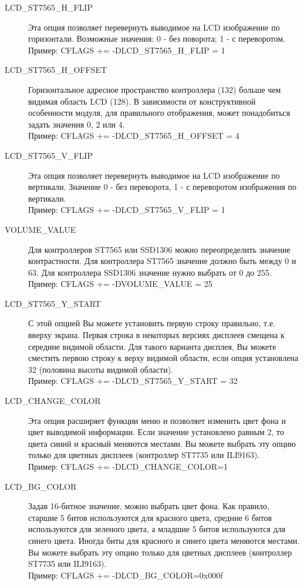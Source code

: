 \begin{description}
  \item[LCD\_ST7565\_H\_FLIP] Эта опция позволяет перевернуть выводимое на LCD изображение по горизонтали.
Возможные значения: 0 - без поворота; 1 - с переворотом.\\
Пример: CFLAGS += -DLCD\_ST7565\_H\_FLIP = 1
   
  \item[LCD\_ST7565\_H\_OFFSET] Горизонтальное адресное пространство контроллера (132) больше чем видимая область LCD (128).
В зависимости от конструктивной особенности модуля, для правильного отображения, может понадобиться задать значения 
0, 2 или 4.\\
Пример: CFLAGS += -DLCD\_ST7565\_H\_OFFSET = 4

  \item[LCD\_ST7565\_V\_FLIP] Эта опция позволяет перевернуть выводимое на LCD изображение по вертикали.
Значение 0 - без переворота, 1 - с переворотом изображения по вертикали.\\
Пример: CFLAGS += -DLCD\_ST7565\_V\_FLIP = 1

  \item[VOLUME\_VALUE] Для контроллеров ST7565 или SSD1306 можно переопределить значение контрастности.
Для контроллера ST7565 значение должно быть между 0 и 63. Для контроллера SSD1306 значение нужно
выбрать от 0 до 255.\\
Пример: CFLAGS += -DVOLUME\_VALUE = 25

  \item[LCD\_ST7565\_Y\_START] С этой опцией Вы можете установить первую строку правильно, 
т.е. вверху экрана. Первая строка в некоторых версиях дисплеев смещена к середине видимой области. 
Для такого варианта дисплея, Вы можете сместить первою строку к верху видимой области, 
если опция установлена 32 (половина высоты видимой области).\\  
Пример: CFLAGS += -DLCD\_ST7565\_Y\_START = 32

  \item[LCD\_CHANGE\_COLOR] Эта опция расширяет функции меню и позволяет 
изменить цвет фона и цвет выводимой информации. Если значение установлено равным 2, то цвета синий 
и красный меняются местами. Вы можете выбрать эту опцию только для цветных дисплеев (контроллер ST7735 или ILI9163).\\
Пример: CFLAGS += -DLCD\_CHANGE\_COLOR=1

  \item[LCD\_BG\_COLOR] Задав 16-битное значение, можно выбрать цвет фона.
Как правило, старшие 5 битов используются для красного цвета, средние 6 битов используются для зеленого цвета, 
а младшие 5 битов используются для синего цвета. Иногда биты для красного и синего цвета меняются местами.
Вы можете выбрать эту опцию только для цветных дисплеев (контроллер ST7735 или ILI9163).\\
Пример: CFLAGS += -DLCD\_BG\_COLOR=0x000f


\end{description}
